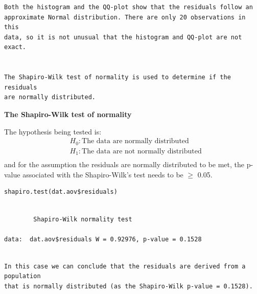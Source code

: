 \documentclass[a4paper, 10pt, fleqn, twosided]{memoir}
\begin{document}
\begin{tcolorbox}[title = Example 1 Assumption 4]
\begin{verbatim}
Both the histogram and the QQ-plot show that the residuals follow an
approximate Normal distribution. There are only 20 observations in this
data, so it is not unusual that the histogram and QQ-plot are not exact.


The Shapiro-Wilk test of normality is used to determine if the residuals
are normally distributed.
\end{verbatim}
\end{tcolorbox}

\textbf{The Shapiro-Wilk test of normality}


The hypothesis being tested is:
\begin{align*}
& H_0: \text{The data are normally distributed}\\
& H_1: \text{The data are not normally distributed}\\
\end{align*}
and for the assumption the residuals are normally distributed to be met, the
p-value associated with the Shapiro-Wilk's test needs to be $\ge$ 0.05.


\begin{tcolorbox}[title = Testing Assumption 4 - Shapiro Wilk Test for Normality]
\begin{verbatim}
shapiro.test(dat.aov$residuals)
\end{verbatim}
\end{tcolorbox}
\clearpage

\begin{tcolorbox}[title = Example 1 Shapiro-Wilk normality test output]
\begin{verbatim}

        Shapiro-Wilk normality test

data:  dat.aov$residuals W = 0.92976, p-value = 0.1528
\end{verbatim}
\end{tcolorbox}


\begin{tcolorbox}[title = Example 1 Shapiro-Wilk normality test interpretation]
\begin{verbatim}

In this case we can conclude that the residuals are derived from a population
that is normally distributed (as the Shapiro-Wilk p-value = 0.1528).

\end{verbatim}
\end{tcolorbox}
\end{document}
